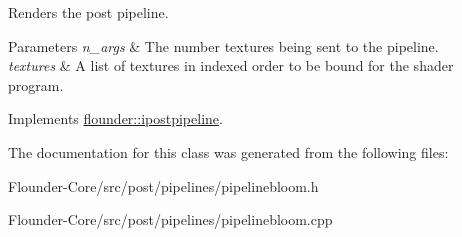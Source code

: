 Renders the post pipeline. 


\begin{DoxyParams}{Parameters}
{\em n\+\_\+args} & The number textures being sent to the pipeline. \\
\hline
{\em textures} & A list of textures in indexed order to be bound for the shader program. \\
\hline
\end{DoxyParams}


Implements \hyperlink{classflounder_1_1ipostpipeline_a975b354967fa358076d02380feb55265}{flounder\+::ipostpipeline}.



The documentation for this class was generated from the following files\+:\begin{DoxyCompactItemize}
\item 
Flounder-\/\+Core/src/post/pipelines/pipelinebloom.\+h\item 
Flounder-\/\+Core/src/post/pipelines/pipelinebloom.\+cpp\end{DoxyCompactItemize}
